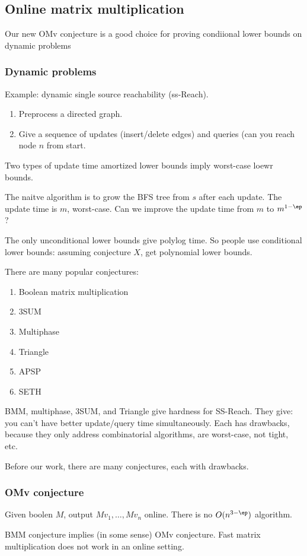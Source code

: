 \subsection{Online matrix multiplication}

Our new OMv conjecture is a good choice for proving condiional lower bounds on dynamic problems

\subsubsection{Dynamic problems}

Example: dynamic single source reachability (ss-Reach).
\begin{enumerate}
\item
Preprocess a directed graph.
\item
Give a sequence of updates (insert/delete edges) and queries (can you reach node $n$ from start.
\end{enumerate}
Two types of update time amortized lower bounds imply worst-case loewr bounds.

The naitve algorithm is to grow the BFS tree from $s$ after each update. The update time is $m$, worst-case. Can we improve the update time from $m$ to $m^{1-\ep}$?  

The only unconditional lower bounds give polylog time. So people use conditional lower bounds: assuming conjecture $X$, get polynomial lower bounds.

There are many popular conjectures:
\begin{enumerate}
\item
Boolean matrix multiplication
\item
3SUM
\item Multiphase
\item Triangle
\item APSP
\item SETH
\end{enumerate}
BMM, multiphase, 3SUM, and Triangle give hardness for SS-Reach. They give: you can't have better update/query time simultaneously. Each has drawbacks, because they only address combinatorial algorithms, are worst-case, not tight, etc.

Before our work, there are many conjectures, each with drawbacks.

\subsubsection{OMv conjecture}
\begin{conj}
Given boolen $M$, output $Mv_1,\ldots, Mv_n$ online. There is no $O(n^{3-\ep})$ algorithm.
\end{conj}
BMM conjecture implies (in some sense) OMv conjecture. Fast matrix multiplication does not work in an online setting.

